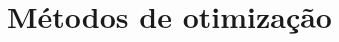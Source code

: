 \begin{comment}
\subsection{Visualizaçâo de dados}

A Figura \ref{fig:metodo_4} ilustra o método que empregamos na avaliação da capacidade discriminativa dos descritores de formas através das técnicas de visualização dos dados apresentadas.

\begin{figure}[h!]
  \caption{\label{fig:metodo_4} Método de avaliação de descritores multiescala do contorno de formas. (a) Base de imagens. (b) Extração de características. (c) Descritores de formas. (d) Análise de similaridade a partir da matriz-U. (e) Avaliação de agrupamentos a partir da medida silhouette.}
  \centering
  \texttt{[image: metodo\_v4.png]}
\end{figure}

O primeiro passo consiste em realizar a extração de características num conjunto de formas binárias rotuladas (Figura \ref{fig:metodo_4}a e Figura \ref{fig:metodo_4}b) com o método de descrição sob análise. Como resultado temos um conjunto de descritores, ou vetores de características, das referidas formas (Figura \ref{fig:metodo_4}c). 

A avaliação de qualidade dos descritores se dá qualitativamente e quantitativamente. Na avaliação qualitativa (Figura \ref{fig:metodo_4}d) utilizamos a rede auto-organizável de Kohonen para obtenção da matriz de distâncias unificada, ou matriz-U. Essa última é empregada como ferramenta de visualização dos dados, o que possibilita identificar como o método de descrição sob avaliação agrupa as formas. 

Na avaliação quantitativa (Figura \ref{fig:metodo_4}e) utilizamos os rótulos e os vetores de características das formas para calculamos a medida de avaliação de agrupamentos \emph{Silhouette} \cite{Rousseeuw:1987}. Valores médios dessa medida, por classe de formas, indica a habilidade dos descritores em discriminar formas que pertençam a classes distintas e de agrupar formas que pertençam a uma mesma classe.
\end{comment}

 

\section{Métodos de otimização}

